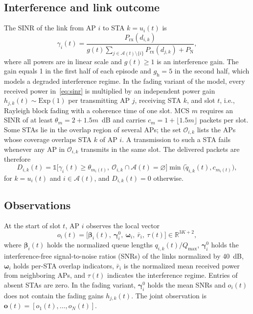 \documentclass{ieeeaccess}
\begin{document}
\subsection{Interference and link outcome}
The SINR of the link from AP $i$ to STA $k = u_i(t)$ is
\begin{equation}
\gamma_{i}(t) = \frac{P_{\text{rx}}(d_{i,k})}{g(t) \sum_{j \in \mathcal{A}(t) \setminus \{i\}} P_{\text{rx}}(d_{j,k}) + P_{\text{N}}},
\label{eq:sinr}
\end{equation}
where all powers are in linear scale and $g(t) \ge 1$ is an interference gain. The gain equals 1 in the first half of each episode and $g_{\text{h}} = 5$ in the second half, which models a degraded interference regime. In the fading variant of the model, every received power in~\eqref{eq:sinr} is multiplied by an independent power gain $h_{j,k}(t) \sim \text{Exp}(1)$ per transmitting AP $j$, receiving STA $k$, and slot $t$, i.e., Rayleigh block fading with a coherence time of one slot. MCS $m$ requires an SINR of at least $\theta_m = 2 + 1.5m$~dB and carries $c_m = 1 + \lfloor 1.5 m \rfloor$ packets per slot. Some STAs lie in the overlap region of several APs; the set $\mathcal{O}_{i,k}$ lists the APs whose coverage overlaps STA $k$ of AP $i$. A transmission to such a STA fails whenever any AP in $\mathcal{O}_{i,k}$ transmits in the same slot. The delivered packets are therefore
\begin{equation}
D_{i,k}(t) = \mathbb{1}\bigl[\gamma_i(t) \ge \theta_{m_i(t)},\ \mathcal{O}_{i,k} \cap \mathcal{A}(t) = \varnothing\bigr] \min\bigl(\tilde{q}_{i,k}(t), c_{m_i(t)}\bigr),
\label{eq:delivery}
\end{equation}
for $k = u_i(t)$ and $i \in \mathcal{A}(t)$, and $D_{i,k}(t) = 0$ otherwise.

\subsection{Observations}
At the start of slot $t$, AP $i$ observes the local vector
\begin{equation}
o_i(t) = \bigl[\boldsymbol{\beta}_i(t),\ \boldsymbol{\gamma}^{0}_i,\ \boldsymbol{\omega}_i,\ \bar{r}_i,\ \tau(t)\bigr] \in \mathbb{R}^{3K+2},
\label{eq:obs}
\end{equation}
where $\boldsymbol{\beta}_i(t)$ holds the normalized queue lengths $q_{i,k}(t)/Q_{\max}$, $\boldsymbol{\gamma}^{0}_i$ holds the interference-free signal-to-noise ratios (SNRs) of the links normalized by 40~dB, $\boldsymbol{\omega}_i$ holds per-STA overlap indicators, $\bar{r}_i$ is the normalized mean received power from neighboring APs, and $\tau(t)$ indicates the interference regime. Entries of absent STAs are zero. In the fading variant, $\boldsymbol{\gamma}^{0}_i$ holds the mean SNRs and $o_i(t)$ does not contain the fading gains $h_{j,k}(t)$. The joint observation is $\mathbf{o}(t) = [o_1(t),\dots,o_N(t)]$.
\end{document}
